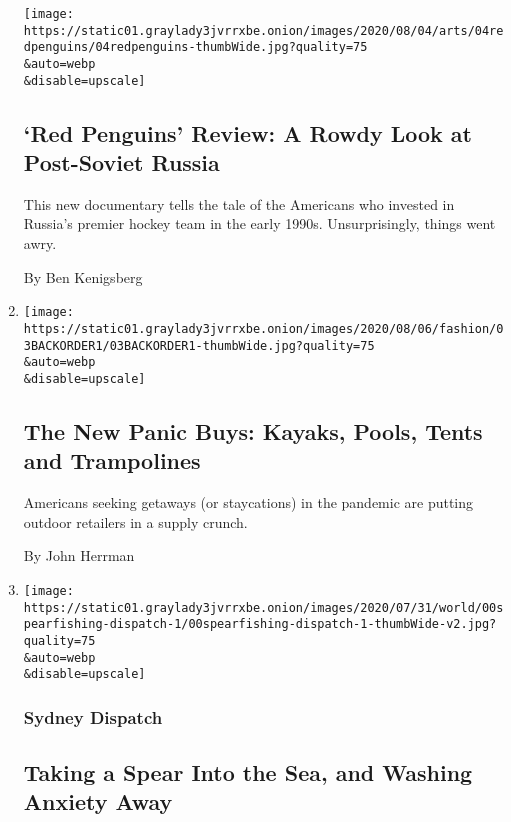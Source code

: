 \begin{enumerate}
  \texttt{[image: https://static01.graylady3jvrrxbe.onion/images/2020/08/04/arts/04redpenguins/04redpenguins-thumbWide.jpg?quality=75\\\&auto=webp\\\&disable=upscale]}

  \hypertarget{red-penguins-review-a-rowdy-look-at-post-soviet-russia}{%
  \subsection{`Red Penguins' Review: A Rowdy Look at Post-Soviet
  Russia}\label{red-penguins-review-a-rowdy-look-at-post-soviet-russia}}

  This new documentary tells the tale of the Americans who invested in
  Russia's premier hockey team in the early 1990s. Unsurprisingly,
  things went awry.

  By Ben Kenigsberg
\item
  \href{/2020/08/04/style/outdoor-camping-gear-pools-backordered.html}{}

  \texttt{[image: https://static01.graylady3jvrrxbe.onion/images/2020/08/06/fashion/03BACKORDER1/03BACKORDER1-thumbWide.jpg?quality=75\\\&auto=webp\\\&disable=upscale]}

  \hypertarget{the-new-panic-buys-kayaks-pools-tents-and-trampolines}{%
  \subsection{The New Panic Buys: Kayaks, Pools, Tents and
  Trampolines}\label{the-new-panic-buys-kayaks-pools-tents-and-trampolines}}

  Americans seeking getaways (or staycations) in the pandemic are
  putting outdoor retailers in a supply crunch.

  By John Herrman
\item
  \href{/2020/08/03/world/australia/spearfishing-sydney-coronavirus.html}{}

  \texttt{[image: https://static01.graylady3jvrrxbe.onion/images/2020/07/31/world/00spearfishing-dispatch-1/00spearfishing-dispatch-1-thumbWide-v2.jpg?quality=75\\\&auto=webp\\\&disable=upscale]}

  \hypertarget{sydney-dispatch}{%
  \subsubsection{Sydney Dispatch}\label{sydney-dispatch}}

  \hypertarget{taking-a-spear-into-the-sea-and-washing-anxiety-away}{%
  \subsection{Taking a Spear Into the Sea, and Washing Anxiety
  Away}\label{taking-a-spear-into-the-sea-and-washing-anxiety-away}}


\end{enumerate}
